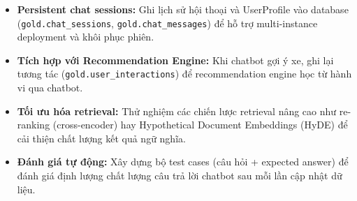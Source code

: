 \begin{itemize}
    \item \textbf{Persistent chat sessions:} Ghi lịch sử hội thoại và UserProfile vào database (\texttt{gold.chat\_sessions}, \texttt{gold.chat\_messages}) để hỗ trợ multi-instance deployment và khôi phục phiên.
    \item \textbf{Tích hợp với Recommendation Engine:} Khi chatbot gợi ý xe, ghi lại tương tác (\texttt{gold.user\_interactions}) để recommendation engine học từ hành vi qua chatbot.
    \item \textbf{Tối ưu hóa retrieval:} Thử nghiệm các chiến lược retrieval nâng cao như re-ranking (cross-encoder) hay Hypothetical Document Embeddings (HyDE) để cải thiện chất lượng kết quả ngữ nghĩa.
    \item \textbf{Đánh giá tự động:} Xây dựng bộ test cases (câu hỏi + expected answer) để đánh giá định lượng chất lượng câu trả lời chatbot sau mỗi lần cập nhật dữ liệu.
\end{itemize}
